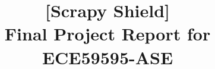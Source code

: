 
% 

% 

% 

% 

% 


% 
% 

% 

\documentclass[conference]{IEEEtran}
\IEEEoverridecommandlockouts

\usepackage{graphicx}
\usepackage{grffile} 
\usepackage[numbers,sort&compress]{natbib}
\usepackage[T1]{fontenc}
\usepackage[utf8]{inputenc}
\usepackage{amsmath,amssymb,amsfonts}
\usepackage{algorithmic}
\usepackage{graphicx}
\usepackage{textcomp}
\usepackage{url}
\usepackage{tcolorbox}
\usepackage{xcolor}
\usepackage{paralist}
\usepackage{enumitem}
\usepackage{underscore}
\usepackage{minted}               %

\def\BibTeX{{\rm B\kern-.05em{\sc i\kern-.025em b}\kern-.08em
    T\kern-.1667em\lower.7ex\hbox{E}\kern-.125emX}}

\title{[Scrapy Shield]\\Final Project Report for ECE59595-ASE}
\author{
}


